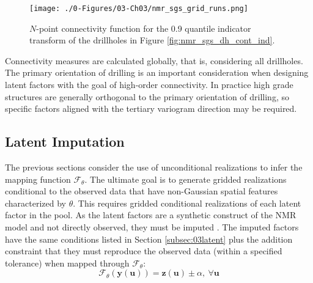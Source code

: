 \begin{figure}[htb!]
    \centering
    \texttt{[image: ./0-Figures/03-Ch03/nmr\_sgs\_grid\_runs.png]}
    \caption{ $N$-point connectivity function for the 0.9 quantile indicator transform of the drillholes in Figure \ref{fig:nmr_sgs_dh_cont_ind}.}
    \label{fig:nmr_sgs_grid_runs}
\end{figure}

Connectivity measures are calculated globally, that is, considering all drillholes. The primary orientation of drilling is an important consideration when designing latent factors with the goal of high-order connectivity. In practice high grade structures are generally orthogonal to the primary orientation of drilling, so specific factors aligned with the tertiary variogram direction may be required.


\FloatBarrier
\subsection{Latent Imputation}
\label{subsec:03impute}

The previous sections consider the use of unconditional realizations to infer the mapping function $\mathcal{F}_{\theta}$. The ultimate goal is to generate gridded realizations conditional to the observed data that have non-Gaussian spatial features characterized by $\theta$. This requires gridded conditional realizations of each latent factor in the pool. As the latent factors are a synthetic construct of the \gls{NMR} model and not directly observed, they must be imputed \citep{little2019statistical}. The imputed factors have the same conditions listed in Section \ref{subsec:03latent} plus the addition constraint that they must reproduce the observed data (within a specified tolerance) when mapped through $\mathcal{F}_{\theta}$:
\begin{equation}
    \mathcal{F}_{\theta}(\mathbf{y}(\mathbf{u})) = \mathbf{z}(\mathbf{u}) \pm \alpha, \ \forall \mathbf{u}
    \label{eq:ftheta0}
\end{equation}

